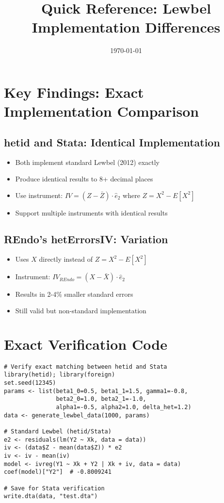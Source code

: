 \documentclass[11pt]{article}
\title{Quick Reference: Lewbel Implementation Differences}
\date{\today}
\begin{document}
\maketitle

\section*{Key Findings: Exact Implementation Comparison}

\subsection*{hetid and Stata: Identical Implementation}
\begin{itemize}
\item Both implement standard Lewbel (2012) exactly
\item Produce identical results to 8+ decimal places
\item Use instrument: $IV = (Z - \bar{Z}) \cdot \hat{e}_2$ where $Z = X^2 - E[X^2]$
\item Support multiple instruments with identical results
\end{itemize}

\subsection*{REndo's hetErrorsIV: Variation}
\begin{itemize}
\item Uses $X$ directly instead of $Z = X^2 - E[X^2]$
\item Instrument: $IV_{REndo} = (X - \bar{X}) \cdot \hat{e}_2$
\item Results in 2-4\% smaller standard errors
\item Still valid but non-standard implementation
\end{itemize}

\section*{Exact Verification Code}

\begin{verbatim}
# Verify exact matching between hetid and Stata
library(hetid); library(foreign)
set.seed(12345)
params <- list(beta1_0=0.5, beta1_1=1.5, gamma1=-0.8,
               beta2_0=1.0, beta2_1=-1.0,
               alpha1=-0.5, alpha2=1.0, delta_het=1.2)
data <- generate_lewbel_data(1000, params)

# Standard Lewbel (hetid/Stata)
e2 <- residuals(lm(Y2 ~ Xk, data = data))
iv <- (data$Z - mean(data$Z)) * e2
iv <- iv - mean(iv)
model <- ivreg(Y1 ~ Xk + Y2 | Xk + iv, data = data)
coef(model)["Y2"]  # -0.8009241

# Save for Stata verification
write.dta(data, "test.dta")
\end{verbatim}
\end{document}
